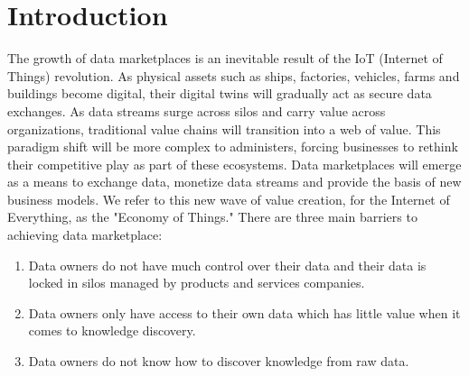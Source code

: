 \documentclass[journal,article,submit,moreauthors,pdftex]{Definitions/mdpi}
\begin{document}



\section{Introduction}
The growth of data marketplaces is an inevitable result of the IoT (Internet of Things) revolution. As physical assets such as ships, factories, vehicles, farms and buildings become digital, their digital twins will gradually act as secure data exchanges.\cite{digitaltwin}\cite{AutonomousDriving} As data streams surge across silos and carry value across organizations, traditional value chains will transition into a web of value. This paradigm shift will be more complex to administers, forcing businesses to rethink their competitive play as part of these ecosystems. Data marketplaces will emerge as a means to exchange data, monetize data streams and provide the basis of new business models. We refer to this new wave of value creation, for the Internet of Everything, as the "Economy of Things." There are three main barriers to achieving data marketplace:
\begin{enumerate}[leftmargin=*,labelsep=4.9mm]
    \item Data owners do not have much control over their data and their data is locked in silos managed by products and services companies.
    \item Data owners only have access to their own data which has little value when it comes to knowledge discovery.
    \item Data owners do not know how to discover knowledge from raw data.
\end{enumerate}
\end{document}
